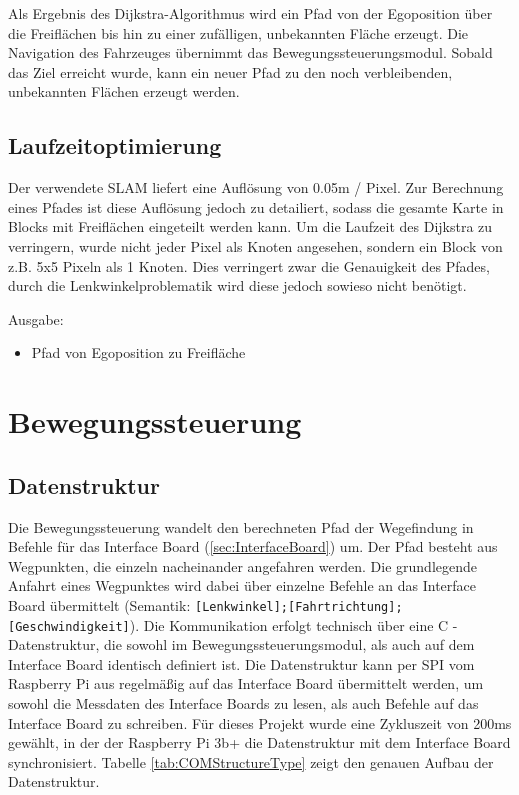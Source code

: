 Als Ergebnis des Dijkstra-Algorithmus wird ein Pfad von der Egoposition über die Freiflächen bis hin zu einer zufälligen, unbekannten Fläche erzeugt. Die Navigation des Fahrzeuges übernimmt das Bewegungssteuerungsmodul. Sobald das Ziel erreicht wurde, kann ein neuer Pfad zu den noch verbleibenden, unbekannten Flächen erzeugt werden.


\subsection{Laufzeitoptimierung}

Der verwendete SLAM liefert eine Auflösung von 0.05m / Pixel. Zur Berechnung eines Pfades ist diese Auflösung jedoch zu detailiert, sodass die gesamte Karte in Blocks mit Freiflächen eingeteilt werden kann. Um die Laufzeit des Dijkstra zu verringern, wurde nicht jeder Pixel als Knoten angesehen, sondern ein Block von z.B. 5x5 Pixeln als 1 Knoten. Dies verringert zwar die Genauigkeit des Pfades, durch die Lenkwinkelproblematik wird diese jedoch sowieso nicht benötigt.

Ausgabe:
\begin{itemize}
\item Pfad von Egoposition zu Freifläche
\end{itemize}










\section{Bewegungssteuerung}

\subsection{Datenstruktur}

Die Bewegungssteuerung wandelt den berechneten Pfad der Wegefindung in Befehle für das Interface Board (\ref{sec:InterfaceBoard}) um. Der Pfad besteht aus Wegpunkten, die einzeln nacheinander angefahren werden. Die grundlegende Anfahrt eines Wegpunktes wird dabei über einzelne Befehle an das Interface Board übermittelt (Semantik: \texttt{[Lenkwinkel];[Fahrtrichtung];[Geschwindigkeit]}). Die Kommunikation erfolgt technisch über eine C - Datenstruktur, die sowohl im Bewegungssteuerungsmodul, als auch auf dem Interface Board identisch definiert ist. Die Datenstruktur kann per SPI vom Raspberry Pi aus regelmäßig auf das Interface Board übermittelt werden, um sowohl die Messdaten des Interface Boards zu lesen, als auch Befehle auf das Interface Board zu schreiben. Für dieses Projekt wurde eine Zykluszeit von 200ms gewählt, in der der Raspberry Pi 3b+ die Datenstruktur mit dem Interface Board synchronisiert. Tabelle \ref{tab:COMStructureType} zeigt den genauen Aufbau der Datenstruktur.

